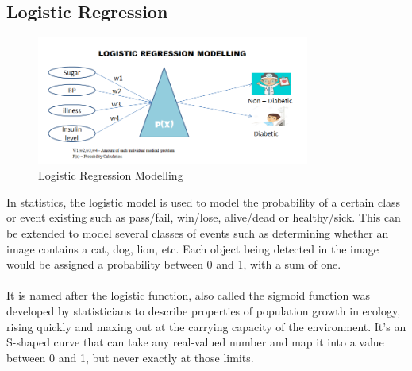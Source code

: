 \subsection*{Logistic Regression}
\begin{figure}[!ht]
	\centering
	\includegraphics[width=0.8\textwidth]{images/logistic-regression.png}
	\caption{Logistic Regression Modelling}
	\centering
	\label{label:logistic}
\end{figure}
In statistics, the logistic model is used to model the probability of a certain class or event existing such as pass/fail, win/lose, alive/dead or healthy/sick. This can be extended to model several classes of events such as determining whether an image contains a cat, dog, lion, etc. Each object being detected in the image would be assigned a probability between 0 and 1, with a sum of one.\\
\\
It is named after the logistic function, also called the sigmoid function was developed by statisticians to describe properties of population growth in ecology, rising quickly and maxing out at the carrying capacity of the environment. It’s an S-shaped curve that can take any real-valued number and map it into a value between 0 and 1, but never exactly at those limits.


